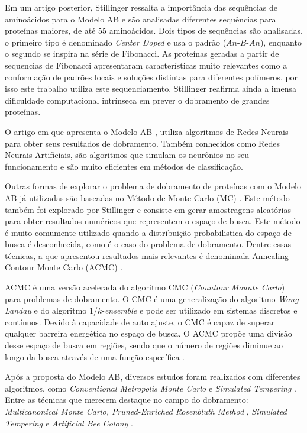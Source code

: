 \documentclass[dm,ppgcomp]{texfurg}
\begin{document}
Em um artigo posterior, Stillinger \cite{stillinger1995collective} ressalta a importância das sequências de aminoácidos para o Modelo AB e são analisadas diferentes sequências para proteínas maiores, de até 55 aminoácidos. Dois tipos de sequências são analisadas, o primeiro tipo é denominado {\it Center Doped} e usa o padrão ($An$-$B$-$An$), enquanto o segundo se inspira na série de Fibonacci. As proteínas geradas a partir de sequencias de Fibonacci apresentaram características muito relevantes como a conformação de padrões locais e soluções distintas para diferentes  polímeros, por isso este trabalho utiliza este sequenciamento. Stillinger \cite{stillinger1995collective} reafirma ainda a imensa dificuldade computacional intrínseca em prever o dobramento de grandes proteínas. 

O artigo em que apresenta o Modelo AB \cite{stillinger1993toy}, utiliza algoritmos de Redes Neurais para obter seus resultados de dobramento. Também conhecidos como Redes Neurais Artificiais, são algoritmos que simulam os neurônios no seu funcionamento e são muito eficientes em métodos de classificação.

Outras formas de explorar o problema de dobramento de proteínas com o Modelo AB já utilizadas são baseadas no Método de Monte Carlo (MC) \cite{stillinger1995collective}. Este método também foi explorado por Stillinger e consiste em gerar amostragens aleatórias para obter resultados numéricos que representem o espaço de busca. Este método é muito comumente utilizado quando a distribuição probabilistica do espaço de busca é desconhecida, como é o caso do problema de dobramento. Dentre essas técnicas, a que apresentou resultados mais relevantes é denominada Annealing Contour Monte Carlo (ACMC) \cite{liang2004annealing}.

ACMC é uma versão acelerada do algoritmo CMC ({\it Countour Mounte Carlo}) para problemas de dobramento.
O CMC é uma generalização do algoritmo {\it Wang-Landau} e do algoritmo  1/$k$-{\it ensemble} e pode ser utilizado em sistemas discretos e contínuos. Devido à capacidade de auto ajuste, o CMC é capaz de superar qualquer barreira energética no espaço de busca. O ACMC propõe uma divisão desse espaço de busca em regiões, sendo que o número de regiões diminue ao longo da busca através de uma função específica \cite{liang2004annealing}. 

Após a proposta do Modelo AB, diversos estudos foram realizados com diferentes algoritmos, como {\it Conventional Metropolis Monte Carlo} e {\it Simulated Tempering} \cite{irback1997local}. Entre as técnicas que merecem destaque no campo do dobramento: {\it Multicanonical Monte Carlo, Pruned-Enriched Rosenbluth Method} \cite{hsu2003structure}, {\it Simulated Tempering} e {\it Artificial Bee Colony} \cite{li2014protein} . 
\end{document}
